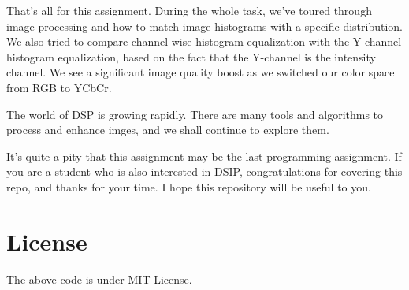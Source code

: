 \documentclass[11pt]{article}
\begin{document}
That's all for this assignment. During the whole task, we've toured
through image processing and how to match image histograms with a
specific distribution. We also tried to compare channel-wise histogram
equalization with the Y-channel histogram equalization, based on the
fact that the Y-channel is the intensity channel. We see a significant
image quality boost as we switched our color space from RGB to YCbCr.

The world of DSP is growing rapidly. There are many tools and algorithms
to process and enhance imges, and we shall continue to explore them.

It's quite a pity that this assignment may be the last programming
assignment. If you are a student who is also interested in DSIP,
congratulations for covering this repo, and thanks for your time. I hope
this repository will be useful to you.

\hypertarget{license}{%
\section{License}\label{license}}

The above code is under MIT License.


    
    
    
\end{document}
